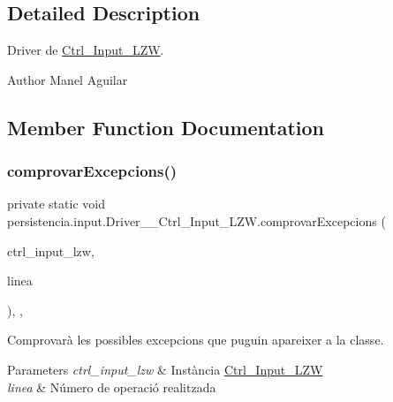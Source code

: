 \subsection{Detailed Description}
Driver de \hyperlink{classpersistencia_1_1input_1_1Ctrl__Input__LZW}{Ctrl\+\_\+\+Input\+\_\+\+L\+ZW}. 

\begin{DoxyAuthor}{Author}
Manel Aguilar 
\end{DoxyAuthor}


\subsection{Member Function Documentation}
\mbox{\label{classpersistencia_1_1input_1_1Driver____Ctrl__Input__LZW_a86e186fca84cfae1f5a019b4853a0902}} 
\subsubsection{\texorpdfstring{comprovar\+Excepcions()}{comprovarExcepcions()}}
{\footnotesize\ttfamily private static void persistencia.\+input.\+Driver\+\_\+\+\_\+\+Ctrl\+\_\+\+Input\+\_\+\+L\+Z\+W.\+comprovar\+Excepcions (\begin{DoxyParamCaption}\item[{\hyperlink{classpersistencia_1_1input_1_1Ctrl__Input__LZW}{Ctrl\+\_\+\+Input\+\_\+\+L\+ZW}}]{ctrl\+\_\+input\+\_\+lzw,  }\item[{String}]{linea }\end{DoxyParamCaption})\hspace{0.3cm}{\ttfamily [inline]}, {\ttfamily [static]}, {\ttfamily [private]}}



Comprovarà les possibles excepcions que puguin apareixer a la classe. 


\begin{DoxyParams}{Parameters}
{\em ctrl\+\_\+input\+\_\+lzw} & Instància \hyperlink{classpersistencia_1_1input_1_1Ctrl__Input__LZW}{Ctrl\+\_\+\+Input\+\_\+\+L\+ZW} \\
\hline
{\em linea} & Número de operació realitzada \\
\hline
\end{DoxyParams}
\mbox{\label{classpersistencia_1_1input_1_1Driver____Ctrl__Input__LZW_a157252ceaf7ec257685654b5ad78049f}} 
